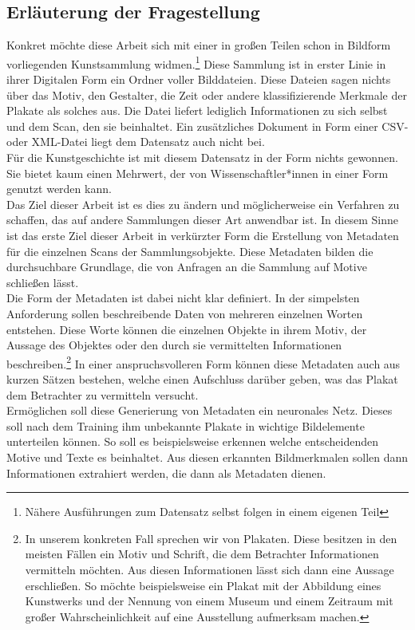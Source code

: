\documentclass[a4paper,12pt,ngerman]{article}
\begin{document}
\subsection{Erläuterung der Fragestellung}
Konkret möchte diese Arbeit sich mit einer in großen Teilen schon in Bildform vorliegenden Kunstsammlung widmen.\footnote{Nähere Ausführungen zum Datensatz selbst folgen in einem eigenen Teil}  Diese Sammlung ist in erster Linie in ihrer Digitalen Form ein Ordner voller Bilddateien. Diese Dateien sagen nichts über das Motiv, den Gestalter, die Zeit oder andere klassifizierende Merkmale der Plakate als solches aus. Die Datei liefert lediglich Informationen zu sich selbst und dem Scan, den sie beinhaltet. Ein zusätzliches Dokument in Form einer CSV- oder XML-Datei liegt dem Datensatz auch nicht bei. \\
Für die Kunstgeschichte ist mit diesem Datensatz in der Form nichts gewonnen. Sie bietet kaum einen Mehrwert, der von Wissenschaftler*innen in einer Form genutzt werden kann. \\
Das Ziel dieser Arbeit ist es dies zu ändern und möglicherweise ein Verfahren zu schaffen, das auf andere Sammlungen dieser Art anwendbar ist. In diesem Sinne ist das erste Ziel dieser Arbeit in verkürzter Form die Erstellung von Metadaten für die einzelnen Scans der Sammlungsobjekte. Diese Metadaten bilden die durchsuchbare Grundlage, die von Anfragen an die Sammlung auf Motive schließen lässt. \\
Die Form der Metadaten ist dabei nicht klar definiert. In der simpelsten Anforderung sollen beschreibende Daten von mehreren einzelnen Worten entstehen. Diese Worte können die einzelnen Objekte in ihrem Motiv, der Aussage des Objektes oder den durch sie vermittelten Informationen beschreiben.\footnote{In unserem konkreten Fall sprechen wir von Plakaten. Diese besitzen in den meisten Fällen ein Motiv und Schrift, die dem Betrachter Informationen vermitteln möchten. Aus diesen Informationen lässt sich dann eine Aussage erschließen. So möchte beispielsweise ein Plakat mit der Abbildung eines Kunstwerks und der Nennung von einem Museum und einem Zeitraum mit großer Wahrscheinlichkeit auf eine Ausstellung aufmerksam machen.}  In einer anspruchsvolleren Form können diese Metadaten auch aus kurzen Sätzen bestehen, welche einen Aufschluss darüber geben, was das Plakat dem Betrachter zu vermitteln versucht. \\
Ermöglichen soll diese Generierung von Metadaten ein neuronales Netz. Dieses soll nach dem Training ihm unbekannte Plakate in wichtige Bildelemente unterteilen können. So soll es beispielsweise erkennen welche entscheidenden Motive und Texte es beinhaltet. Aus diesen erkannten Bildmerkmalen sollen dann Informationen extrahiert werden, die dann als Metadaten dienen. \\
\end{document}
